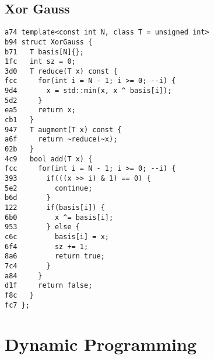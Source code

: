 \documentclass[10pt, a4paper, twoside]{article}
\begin{document}
\subsection{Xor Gauss}
\begin{lstlisting}
a74 template<const int N, class T = unsigned int>
b94 struct XorGauss {
b71   T basis[N]{};
1fc   int sz = 0;
3d0   T reduce(T x) const {
fcc     for(int i = N - 1; i >= 0; --i) {
9d4       x = std::min(x, x ^ basis[i]);
5d2     }
ea5     return x;
cb1   }
947   T augment(T x) const { 
a6f     return ~reduce(~x);
02b   }
4c9   bool add(T x) {
fcc     for(int i = N - 1; i >= 0; --i) {
393       if(((x >> i) & 1) == 0) {
5e2         continue;
b6d       }
122       if(basis[i]) {
6b0         x ^= basis[i];
953       } else {
c6c         basis[i] = x;
6f4         sz += 1;
8a6         return true;
7c4       }
a84     }
d1f     return false;
f8c   }
fc7 };
\end{lstlisting}



%
%

\section{Dynamic Programming}
\end{document}
